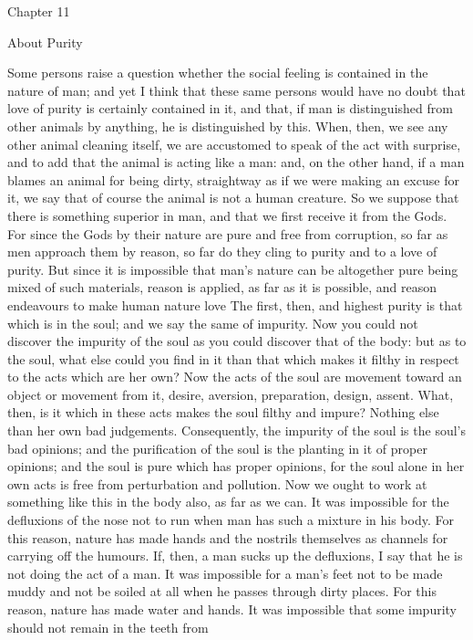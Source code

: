\documentclass[a4paper]{article}
\begin{document}
Chapter 11

About Purity

    Some persons raise a question whether the social feeling is contained in
the nature of man; and yet I think that these same persons would have no doubt
that love of purity is certainly contained in it, and that, if man is
distinguished from other animals by anything, he is distinguished by this.
When, then, we see any other animal cleaning itself, we are accustomed to speak
of the act with surprise, and to add that the animal is acting like a man: and,
on the other hand, if a man blames an animal for being dirty, straightway as if
we were making an excuse for it, we say that of course the animal is not a
human creature. So we suppose that there is something superior in man, and that
we first receive it from the Gods. For since the Gods by their nature are pure
and free from corruption, so far as men approach them by reason, so far do they
cling to purity and to a love of purity. But since it is impossible that man's
nature can be altogether pure being mixed of such materials, reason is applied,
as far as it is possible, and reason endeavours to make human nature love
    The first, then, and highest purity is that which is in the soul; and we
say the same of impurity. Now you could not discover the impurity of the soul
as you could discover that of the body: but as to the soul, what else could you
find in it than that which makes it filthy in respect to the acts which are her
own? Now the acts of the soul are movement toward an object or movement from
it, desire, aversion, preparation, design, assent. What, then, is it which in
these acts makes the soul filthy and impure? Nothing else than her own bad
judgements. Consequently, the impurity of the soul is the soul's bad opinions;
and the purification of the soul is the planting in it of proper opinions; and
the soul is pure which has proper opinions, for the soul alone in her own acts
is free from perturbation and pollution.
    Now we ought to work at something like this in the body also, as far as we
can. It was impossible for the defluxions of the nose not to run when man has
such a mixture in his body. For this reason, nature has made hands and the
nostrils themselves as channels for carrying off the humours. If, then, a man
sucks up the defluxions, I say that he is not doing the act of a man. It was
impossible for a man's feet not to be made muddy and not be soiled at all when
he passes through dirty places. For this reason, nature has made water and
hands. It was impossible that some impurity should not remain in the teeth from
\end{document}
